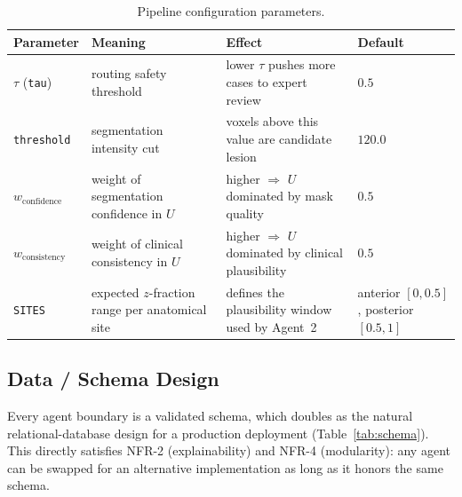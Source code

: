 \documentclass[11pt,a4paper]{article}
\begin{document}
\begin{table}[htbp]
\centering
\caption{Pipeline configuration parameters.}
\label{tab:config}
\small
\begin{tabular}{lp{3.6cm}p{4.6cm}p{2.4cm}}
\toprule
\textbf{Parameter} & \textbf{Meaning} & \textbf{Effect} & \textbf{Default} \\
\midrule
$\tau$ (\texttt{tau}) & routing safety threshold & lower $\tau$ pushes more cases to expert review & $0.5$ \\
\texttt{threshold} & segmentation intensity cut & voxels above this value are candidate lesion & $120.0$ \\
$w_{\text{confidence}}$ & weight of segmentation confidence in $U$ & higher $\Rightarrow$ $U$ dominated by mask quality & $0.5$ \\
$w_{\text{consistency}}$ & weight of clinical consistency in $U$ & higher $\Rightarrow$ $U$ dominated by clinical plausibility & $0.5$ \\
\texttt{SITES} & expected $z$-fraction range per anatomical site & defines the plausibility window used by Agent~2 & anterior $[0,0.5]$, posterior $[0.5,1]$ \\
\bottomrule
\end{tabular}
\end{table}

\subsection{Data / Schema Design}
Every agent boundary is a validated schema, which doubles as the natural relational-database design for a production deployment (Table~\ref{tab:schema}). This directly satisfies NFR-2 (explainability) and NFR-4 (modularity): any agent can be swapped for an alternative implementation as long as it honors the same schema.
\end{document}
